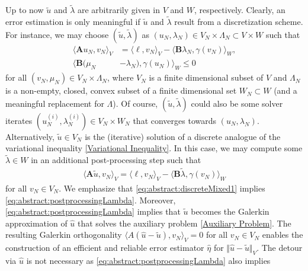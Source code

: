 \documentclass[12pt,twoside,reqno]{amsart}
\theoremstyle{definition}
\numberwithin{equation}{section}
\newcommand{\A} {\bm{A}}
\newcommand{\B} {\bm{B}}
\newcommand{\norm}[1]    {\Vert #1 \Vert}
\begin{document}
    Up to now $\tilde{u}$ and $\tilde{\lambda}$ are arbitrarily given in $V$ and $W$, respectively. Clearly, an error estimation is only meaningful if $\tilde{u}$ and $\tilde{\lambda}$ result from a discretization scheme. For instance, we may choose $(\tilde{u},\tilde{\lambda})$ as $(u_N,\lambda_N) \in V_N \times \Lambda_N \subset V \times W$ such that
    \begin{subequations}%
            \begin{align}
                \langle \bm{A}u_N,v_N\rangle_V &= \langle \bm{\ell}, v_N\rangle_V - \langle\B \lambda_N, \gamma(v_N)\rangle_W, \label{eq:abstract:discreteMixed1}\\
                \langle \B(\mu_N&-\lambda_N),\gamma(u_N)\rangle_W \leq 0 
            \end{align}
    \end{subequations}
   for all $(v_N,\mu_N) \in V_N \times \Lambda_N$, where 
$V_N$ is a finite dimensional subset of $V$ and $\Lambda_N$ is a non-empty, closed, convex subset of a finite dimensional set $W_N \subset W$ (and a meaningful replacement for $\Lambda$). Of course, $(\tilde{u},\tilde{\lambda})$ could also be some solver iterates $(u_N^{(i)},\lambda_N^{(i)}) \in V_N \times W_N$ that converges towards $(u_N,\lambda_N)$. Alternatively, $\tilde{u} \in V_N$ is the (iterative) solution of a discrete analogue of the variational inequality \eqref{Variational Inequality}. In this case, we may compute some $\tilde{\lambda} \in W$ in an additional post-processing step such that
%
\begin{align} \label{eq:abstract:postprocessingLambda}
        \langle \bm{A}\tilde{u},v_N\rangle_V = \langle \bm{\ell},v_N\rangle_V-\langle\B{\tilde{\lambda}}, \gamma(v_N)\rangle_W
 \end{align}
 for all $v_N \in V_N$.
We emphasize that \eqref{eq:abstract:discreteMixed1} implies \eqref{eq:abstract:postprocessingLambda}. Moreover, \eqref{eq:abstract:postprocessingLambda} implies that $\tilde{u}$ becomes the Galerkin approximation of $\hat{u}$ that solves the auxiliary problem \eqref{Auxiliary Problem}. The resulting Galerkin orthogonality $\langle A(\hat{u}-\tilde{u}),v_N \rangle_V =0$ for all $v_N \in V_N$ enables the construction of an efficient and reliable error estimator $\hat{\eta}$ for $\norm{\hat{u}-\tilde{u}}_V$.
The detour via $\hat{u}$ is not necessary as \eqref{eq:abstract:postprocessingLambda} also implies
\end{document}
